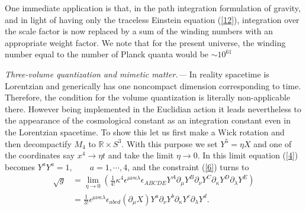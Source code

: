 \documentclass
[twocolumn,prl,unsortedaddress,superscriptaddress,showpacs]{revtex4}%
\begin{document}
One immediate application is that, in the path integration formulation of
gravity, and in light of having only the traceless Einstein equation
(\ref{12}), integration over the scale factor is now replaced by a sum of the
winding numbers with an appropriate weight factor. We note that for the
present universe, the winding number equal to the number of Planck quanta
would be $\sim10^{61}$ \cite{CC}

\emph{Three-volume quantization and mimetic matter.---}
In reality spacetime is Lorentzian and generically has one noncompact
dimension corresponding to time. Therefore, the condition for the volume
quantization is literally non-applicable there. However being implemented in
the Euclidian action it leads nevertheless to the appearance of the
cosmological constant as an integration constant even in the Lorentzian
spacetime. To show this let us first make a Wick rotation and then
decompactify $M_{4}$ to $\mathbb{R\times}S^{3}.$ With this purpose we set
$Y^{5}=\eta X$ and one of the coordinates say $x^{4}\rightarrow\eta t$ and
take the limit $\eta\rightarrow0$. In this limit equation (\ref{4}) becomes
$Y^{a}Y^{a}=1,\qquad a=1,\cdots,4$, and the constraint (\ref{6}) turns to
\begin{align}
\sqrt{g}  &  =\lim_{\eta\rightarrow0}\left(  \frac{1}{4!}\kappa^{4}%
\epsilon^{\mu\nu\kappa\lambda}\epsilon_{ABCDE}Y^{A}\partial_{\mu}Y^{B}%
\partial_{\nu}Y^{C}\partial_{\kappa}Y^{D}\partial_{\lambda}Y^{E}\right)
\nonumber\\
&  =\frac{1}{3!}\epsilon^{\mu\nu\kappa\lambda}\epsilon_{abcd}\left(
\partial_{\mu}X\right)  Y^{a}\partial_{\nu}Y^{b}\partial_{\kappa}Y^{c}%
\partial_{\lambda}Y^{d}. \label{16}%
\end{align}
\end{document}
